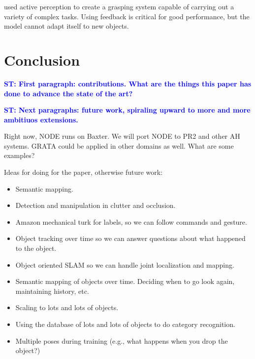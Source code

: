 \documentclass{article}
\newcommand{\stnote}[1]{\textcolor{blue}{\textbf{ST: #1}}}
\begin{document}
\citet{hudson12} used active perception to create a grasping system
capable of carrying out a variety of complex tasks.  Using feedback is
critical for good performance, but the model cannot adapt itself to
new objects.



\section{Conclusion}

\stnote{First paragraph:  contributions.  What are the things this paper has done to advance the state of the art?}

\stnote{Next paragraphs: future work, spiraling upward to more and
  more ambitiuos extensions.}

Right now, NODE runs on Baxter. We will port NODE to PR2 and other AH systems.
GRATA could be applied in other domains as well.  What are some examples?

Ideas for doing for the paper, otherwise future work: 
\begin{itemize}
\item Semantic mapping. 
\item Detection and manipulation in clutter and occlusion.
\item Amazon mechanical turk for labels, so we can follow commands and gesture.
\item Object tracking over time so we can answer questions about what
  happened to the object.
\item Object oriented SLAM so we can handle joint localization and mapping.
\item Semantic mapping of objects over time.  Deciding when to go look
  again, maintaining history, etc. 
\item Scaling to lots and lots of objects.
\item Using the database of lots and lots of objects to do category recognition.
\item Multiple poses during training (e.g., what happens when you drop
  the object?)
\end{itemize}


{\tiny


}
\end{document}
